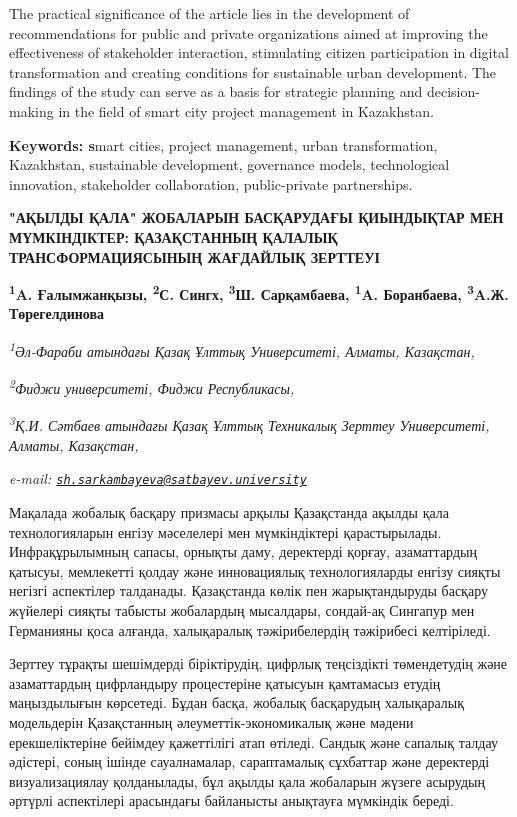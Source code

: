 {The practical significance of the article lies in the development of
recommendations for public and private organizations aimed at improving
the effectiveness of stakeholder interaction, stimulating citizen
participation in digital transformation and creating conditions for
sustainable urban development. The findings of the study can serve as a
basis for strategic planning and decision-making in the field of smart
city project management in Kazakhstan.

{\bfseries Keywords: s}mart cities, project management, urban
transformation, Kazakhstan, sustainable development, governance models,
technological innovation, stakeholder collaboration, public-private
partnerships.

{\bfseries "АҚЫЛДЫ ҚАЛА" ЖОБАЛАРЫН БАСҚАРУДАҒЫ ҚИЫНДЫҚТАР МЕН МҮМКІНДІКТЕР:
ҚАЗАҚСТАННЫҢ ҚАЛАЛЫҚ ТРАНСФОРМАЦИЯСЫНЫҢ ЖАҒДАЙЛЫҚ ЗЕРТТЕУІ}

{\bfseries \textsuperscript{1}A. Ғалымжанқызы, \textsuperscript{2}С. Сингх,
\textsuperscript{3}Ш. Сарқамбаева\textsuperscript{\envelope },
\textsuperscript{1}A. Боранбаева, \textsuperscript{3}A.Ж. Төрегелдинова}

\emph{\textsuperscript{1}Әл-Фараби атындағы Қазақ Ұлттық Университеті,
Алматы, Казақстан,}

\emph{\textsuperscript{2}Фиджи университеті, Фиджи Республикасы,}

\emph{\textsuperscript{3}Қ.И. Сәтбаев атындағы Қазақ Ұлттық Техникалық
Зерттеу Университеті, Алматы, Казақстан,}

\emph{e-mail:
\href{mailto:sh.sarkambayeva@satbayev.university}{\nolinkurl{sh.sarkambayeva@satbayev.university}}}

Мақалада жобалық басқару призмасы арқылы Қазақстанда ақылды қала
технологияларын енгізу мәселелері мен мүмкіндіктері қарастырылады.
Инфрақұрылымның сапасы, орнықты даму, деректерді қорғау, азаматтардың
қатысуы, мемлекетті қолдау және инновациялық технологияларды енгізу
сияқты негізгі аспектілер талданады. Қазақстанда көлік пен
жарықтандыруды басқару жүйелері сияқты табысты жобалардың мысалдары,
сондай-ақ Сингапур мен Германияны қоса алғанда, халықаралық
тәжірибелердің тәжірибесі келтіріледі.

Зерттеу тұрақты шешімдерді біріктірудің, цифрлық теңсіздікті
төмендетудің және азаматтардың цифрландыру процестеріне қатысуын
қамтамасыз етудің маңыздылығын көрсетеді. Бұдан басқа, жобалық
басқарудың халықаралық модельдерін Қазақстанның әлеуметтік-экономикалық
және мәдени ерекшеліктеріне бейімдеу қажеттілігі атап өтіледі. Сандық
және сапалық талдау әдістері, соның ішінде сауалнамалар, сараптамалық
сұхбаттар және деректерді визуализациялау қолданылады, бұл ақылды қала
жобаларын жүзеге асырудың әртүрлі аспектілері арасындағы байланысты
анықтауға мүмкіндік береді.

}
